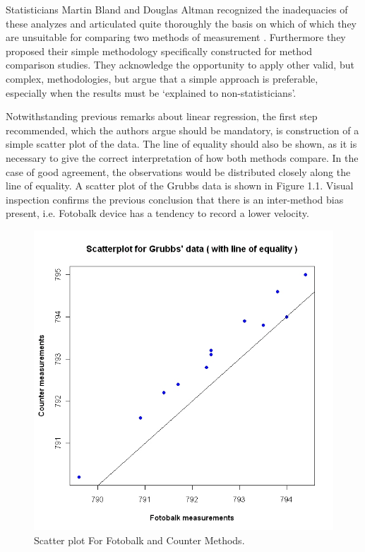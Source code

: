 \documentclass[Main.tex]{subfiles}
\begin{document}
Statisticians Martin Bland and Douglas Altman recognized the inadequacies of these analyzes and articulated quite thoroughly the basis on which of which they are unsuitable for comparing two methods of measurement \citep*{BA83}. Furthermore they proposed their simple methodology specifically constructed for method comparison studies. They acknowledge the opportunity to apply other valid, but complex, methodologies, but argue that a simple approach is preferable, especially when the	results must be `explained to non-statisticians'.
	
Notwithstanding previous remarks about linear regression, the first step recommended, which the authors argue should be mandatory, is construction of a simple scatter plot of the data. The line of equality should also be shown, as it is necessary to give the correct interpretation of how both methods compare. In the case of good agreement, the observations would be distributed closely along the line of equality. A scatter plot of the Grubbs data is shown in Figure 1.1. Visual inspection confirms the previous conclusion that there is an inter-method bias present, i.e. Fotobalk device has a tendency to record a lower velocity.
	
	\begin{figure}[h!]
		\begin{center}
			\includegraphics[width=125mm]{images/GrubbsScatter.jpeg}
			\caption{Scatter plot For Fotobalk and Counter Methods.}\label{GrubbsScatter}
		\end{center}
	\end{figure}
	
\end{document}
